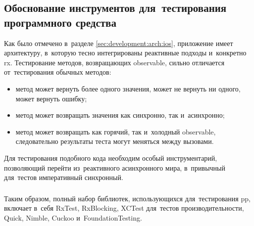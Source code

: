 \subsection{Обоснование инструментов для~тестирования программного средства}
\label{sec:testing:tech}

Как было отмечено в~разделе \ref{sec:development:arch:ios}, приложение имеет архитектуру, в~которую тесно интегрированы реактивные подходы и~конкретно \gls{rx}. Тестирование методов, возвращающих \gls{observable}, сильно отличается от~тестирования обычных методов:

\begin{itemize}
	\item метод может вернуть более одного значения, может не вернуть ни одного, может вернуть ошибку;
	\item метод может возвращать значения как синхронно, так и~асинхронно;
	\item метод может возвращать как горячий, так и~холодный \gls{observable}, следовательно результаты теста могут меняться между вызовами.
\end{itemize}

Для тестирования подобного кода необходим особый инструментарий, позволяющий перейти из~реактивного асинхронного мира, в~привычный для~тестов императивный синхронный.




\subsubsection{}
\label{sec:testing:tech:result}
Таким образом, полный набор библиотек, использующихся для~тестирования \gls{pp}, включает в~себя RxTest, RxBlocking, XCTest для~тестов производительности, Quick, Nimble, Cuckoo и~FoundationTesting.
